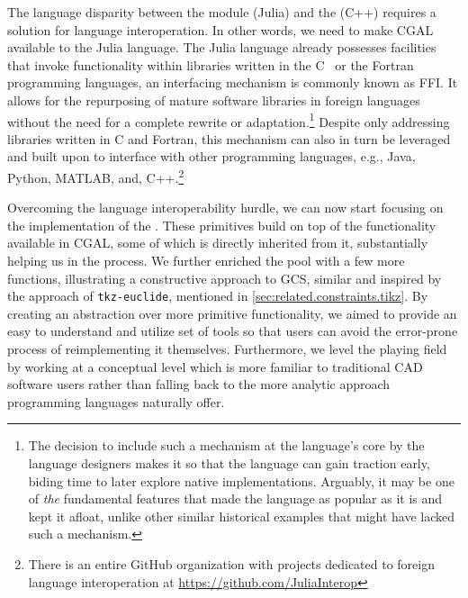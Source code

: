The language disparity between the \primitives{} module (Julia) and the
\geomlibrary{} (C++) requires a solution for language interoperation.  In other
words, we need to make \ac{CGAL} available to the Julia language.  The Julia
language already possesses facilities that invoke functionality within libraries
written in the C~\cite{Kernighan:1988:C} or the
Fortran~\cite{Backus:1957:Fortran} programming languages, an interfacing
mechanism is commonly known as \ac{FFI}.  It allows for the repurposing of
mature software libraries in foreign languages without the need for a complete
rewrite or adaptation.\footnote{The decision to include such a mechanism at the
language's core by the language designers makes it so that the language can gain
traction early, biding time to later explore native implementations.  Arguably,
it may be one of \textit{the} fundamental features that made the language as
popular as it is and kept it afloat, unlike other similar historical examples
that might have lacked such a mechanism.}  Despite only addressing libraries
written in C and Fortran, this mechanism can also in turn be leveraged and built
upon to interface with other programming languages, e.g., Java, Python, MATLAB,
and, C++.\footnote{There is an entire GitHub organization with projects
dedicated to foreign language interoperation at
\url{https://github.com/JuliaInterop}}

Overcoming the language interoperability hurdle, we can now start focusing on
the implementation of the \primitives{}.  These primitives build on top of the
functionality available in \ac{CGAL}, some of which is directly inherited from
it, substantially helping us in the process.  We further enriched the pool with
a few more functions, illustrating a constructive approach to \ac{GCS}, similar
and inspired by the approach of \texttt{tkz-euclide}, mentioned in
\cref{sec:related.constraints.tikz}.  By creating an abstraction over more
primitive functionality, we aimed to provide an easy to understand and utilize
set of tools so that users can avoid the error-prone process of reimplementing
it themselves.  Furthermore, we level the playing field by working at a
conceptual level which is more familiar to traditional \ac{CAD} software users
rather than falling back to the more analytic approach programming languages
naturally offer.

